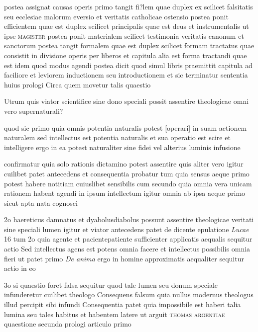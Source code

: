 \documentclass[twoside, openright]{article}
\newcommand{\name}[1]{\textsc{#1}}
\newcommand{\worktitle}[1]{\textit{#1}}
\begin{document}
        \pstart
        postea assignat causas operis primo tangit fi?lem quae duplex ex scilicet falsitatis seu ecclesiae malorum eversio et veritatis catholicae ostensio postea ponit efficientem quae est duplex scilicet principalis quae est deus et instrumentalis ut ipse \name{magister} postea ponit materialem scilicet testimonia veritatis canonum et sanctorum  postea tangit formalem quae est duplex scilicet formam tractatus quae consistit in divisione operis per liberos et capitula alia est forma tractandi quae est idem quod modus agendi  postea dicit quod simul libris praemittit capitula ad faciliore et leviorem inductionem seu introductionem et sic terminatur sententia huius prologi Circa quem movetur talis quaestio
        \pend
     
        \pstart
        Utrum quis viator scientifice sine dono speciali possit assentire theologicae omni vero supernaturali?
        \pend
     
        \pstart
        quod sic primo quia omnis potentia naturalis potest [operari] in suam actionem naturalem sed intellectus est potentia naturalis et sua operatio est scire et intelligere ergo in ea potest naturaliter sine fidei vel alterius luminis infusione
        \pend
     
        \pstart
        confirmatur quia solo rationis dictamino potest assentire quis aliter vero igitur cuilibet patet antecedens et consequentia probatur tum quia sensus aeque primo potest habere notitiam cuiuslibet sensibilis cum secundo quia omnia vera unicam rationem habent agendi in ipsum intellectum igitur omnia ab ipsa aeque primo sicut apta nata cognosci 
        \pend
     
        \pstart
        2o haereticus damnatus et dyabolusdiabolus possunt assentire theologicae veritati sine speciali lumen igitur et viator antecedens patet de dicente epulatione \worktitle{Lucae} 16 tum 2o quia agente et pacientepatiente sufficienter applicatis aequalis sequitur actio Sed intellectus agens est potens omnia facere et intellectus possibilis omnia fieri ut patet primo \worktitle{De anima} ergo in homine approximatis aequaliter sequitur actio in eo
        \pend
     
        \pstart
        3o si quaestio foret falsa sequitur quod tale lumen seu donum speciale infunderetur cuilibet theologo Consequens falsum quia nullus modernus theologus illud percipit sibi infundi Consequentia patet quia impossibile est haberi talia lumina seu tales habitus et habentem latere ut arguit \name{thomas argentiae} quaestione secunda prologi articulo primo 
        \pend
     
\end{document}
